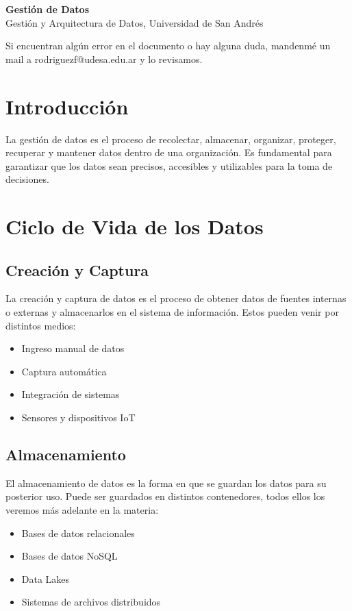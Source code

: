 \documentclass[12pt]{article}
\begin{document}
\begin{center}
  {\LARGE \textbf{Gestión de Datos}}\\[0.5em]
  {Gestión y Arquitectura de Datos, Universidad de San Andrés}
\end{center}

Si encuentran algún error en el documento o hay alguna duda, mandenmé un mail a rodriguezf@udesa.edu.ar y lo revisamos.

\section{Introducción}
La gestión de datos es el proceso de recolectar, almacenar, organizar, proteger, recuperar y mantener datos dentro de una organización. Es fundamental para garantizar que los datos sean precisos, accesibles y utilizables para la toma de decisiones.

\section{Ciclo de Vida de los Datos}

\subsection{Creación y Captura}
La creación y captura de datos es el proceso de obtener datos de fuentes internas o externas y almacenarlos en el sistema de información. Estos pueden venir por distintos medios:
\begin{itemize}
    \item Ingreso manual de datos
    \item Captura automática
    \item Integración de sistemas
    \item Sensores y dispositivos IoT
\end{itemize}

\subsection{Almacenamiento}
El almacenamiento de datos es la forma en que se guardan los datos para su posterior uso. Puede ser guardados en distintos contenedores, todos ellos los veremos más adelante en la materia:
\begin{itemize}
    \item Bases de datos relacionales
    \item Bases de datos NoSQL
    \item Data Lakes
    \item Sistemas de archivos distribuidos
\end{itemize}
\end{document}
